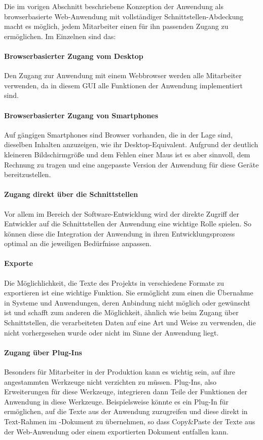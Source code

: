 Die im vorigen Abschnitt beschriebene Konzeption der Anwendung als browserbasierte Web-Anwendung mit vollständiger Schnittstellen-Abdeckung macht es möglich, jedem Mitarbeiter einen für ihn passenden Zugang zu ermöglichen. Im Einzelnen sind das:

\paragraph{Browserbasierter Zugang vom Desktop} Den Zugang zur Anwendung mit einem Webbrowser werden alle Mitarbeiter verwenden, da in diesem GUI alle Funktionen der Anwendung implementiert sind.

\paragraph{Browserbasierter Zugang von Smartphones} Auf gängigen Smartphones sind Browser vorhanden, die in der Lage sind, dieselben Inhalten anzuzeigen, wie ihr Desktop-Equivalent. Aufgrund der deutlich kleineren Bildschirmgröße und dem Fehlen einer Maus ist es aber sinnvoll, dem Rechnung zu tragen und eine angepasste Version der Anwendung für diese Geräte bereitzustellen. 

\paragraph{Zugang direkt über die Schnittstellen} Vor allem im Bereich der Software-Entwicklung wird der direkte Zugriff der Entwickler auf die Schnittstellen der Anwendung eine wichtige Rolle spielen. So können diese die Integration der Anwendung in ihren Entwicklungsprozess optimal an die jeweiligen Bedürfnisse anpassen.

\paragraph{Exporte} Die Möglichlichkeit, die Texte des Projekts in verschiedene Formate zu exportieren ist eine wichtige Funktion. Sie ermöglicht zum einen die Übernahme in Systeme und Anwendungen, deren Anbindung nicht möglich oder gewünscht ist und schafft zum anderen die Möglichkeit, ähnlich wie beim Zugang über Schnittstellen, die verarbeiteten Daten auf eine Art und Weise zu verwenden, die nicht vorhergesehen wurde oder nicht im Sinne der Anwendung liegt.

\paragraph{Zugang über Plug-Ins} Besonders für Mitarbeiter in der Produktion kann es wichtig sein, auf ihre angestammten Werkzeuge nicht verzichten zu müssen. Plug-Ins, also Erweiterungen für diese Werkzeuge, integrieren dann Teile der Funktionen der Anwendung in diese Werkzeuge. Beispielsweise könnte es ein Plug-In für  ermöglichen, auf die Texte aus der Anwendung zuzugreifen und diese direkt in Text-Rahmen im -Dokument zu übernehmen, so dass Copy\&Paste der Texte aus der Web-Anwendung oder einem exportierten Dokument entfallen kann.

